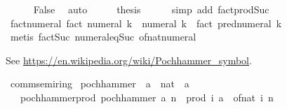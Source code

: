 \begin{isabellebody}
\ \ \ \ \isamarkupfalse%
\ False\ \isamarkupfalse%
\ auto\isanewline
\ \ \isamarkupfalse%
\ \isamarkupfalse%
\ {\isacharquery}{\kern0pt}thesis\isanewline
\ \ \ \ \isamarkupfalse%
\ {\isacharparenleft}{\kern0pt}simp\ add{\isacharcolon}{\kern0pt}\ fact{\isacharunderscore}{\kern0pt}prod{\isacharunderscore}{\kern0pt}Suc{\isacharparenright}{\kern0pt}\isanewline
{}\isamarkupfalse%
%
\endisatagproof
{\isafoldproof}%
%
\isadelimproof
\isanewline
%
\endisadelimproof
\isanewline
{}\isamarkupfalse%
\ fact{\isacharunderscore}{\kern0pt}numeral{\isacharcolon}{\kern0pt}\ {\isachardoublequoteopen}fact\ {\isacharparenleft}{\kern0pt}numeral\ k{\isacharparenright}{\kern0pt}\ {\isacharequal}{\kern0pt}\ numeral\ k\ {\isacharasterisk}{\kern0pt}\ fact\ {\isacharparenleft}{\kern0pt}pred{\isacharunderscore}{\kern0pt}numeral\ k{\isacharparenright}{\kern0pt}{\isachardoublequoteclose}\isanewline
\ \ %
\isanewline
%
\isadelimproof
\ \ %
\endisadelimproof
%
\isatagproof
{}\isamarkupfalse%
\ {\isacharparenleft}{\kern0pt}metis\ fact{\isacharunderscore}{\kern0pt}Suc\ numeral{\isacharunderscore}{\kern0pt}eq{\isacharunderscore}{\kern0pt}Suc\ of{\isacharunderscore}{\kern0pt}nat{\isacharunderscore}{\kern0pt}numeral{\isacharparenright}{\kern0pt}%
\endisatagproof
{\isafoldproof}%
%
\isadelimproof
%
\endisadelimproof
%
\isadelimdocument
%
\endisadelimdocument
%
\isatagdocument
%
\isamarkuptrue%
%
\endisatagdocument
{\isafolddocument}%
%
\isadelimdocument
%
\endisadelimdocument
%
\begin{isamarkuptext}%
See \url{https://en.wikipedia.org/wiki/Pochhammer_symbol}.%
\end{isamarkuptext}\isamarkuptrue%
\isamarkupfalse%
\ comm{\isacharunderscore}{\kern0pt}semiring{\isacharunderscore}{\kern0pt}{}\isanewline
{}\isanewline
\isanewline
{}\isamarkupfalse%
\ pochhammer\ {\isacharcolon}{\kern0pt}{\isacharcolon}{\kern0pt}\ {\isachardoublequoteopen}{\isacharprime}{\kern0pt}a\ {\isasymRightarrow}\ nat\ {\isasymRightarrow}\ {\isacharprime}{\kern0pt}a{\isachardoublequoteclose}\isanewline
\ \ \ pochhammer{\isacharunderscore}{\kern0pt}prod{\isacharcolon}{\kern0pt}\ {\isachardoublequoteopen}pochhammer\ a\ n\ {\isacharequal}{\kern0pt}\ prod\ {\isacharparenleft}{\kern0pt}{\isasymlambda}i{\isachardot}{\kern0pt}\ a\ {\isacharplus}{\kern0pt}\ of{\isacharunderscore}{\kern0pt}nat\ i{\isacharparenright}{\kern0pt}\ {\isacharbraceleft}{\kern0pt}{}{\isachardot}{\kern0pt}{\isachardot}{\kern0pt}{\isacharless}{\kern0pt}n{\isacharbraceright}{\kern0pt}{\isachardoublequoteclose}\isanewline

\end{isabellebody}
